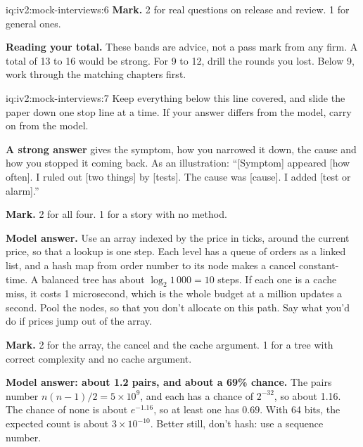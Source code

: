 \begin{solution}{iq:iv2:mock-interviews:6}
\textbf{Mark.} 2 for real questions on release and review. 1 for general ones.

\medskip
\textbf{Reading your total.} These bands are advice, not a pass mark from any firm. A total of 13 to 16 would be strong. For 9 to 12, drill the rounds you lost. Below 9, work through the matching chapters first.

\end{solution}

\begin{solution}{iq:iv2:mock-interviews:7}
Keep everything below this line covered, and slide the paper down one stop line at a time. If your answer differs from the model, carry on from the model.

\ivstop
\textbf{A strong answer} gives the symptom, how you narrowed it down, the cause and how you stopped it coming back. As an illustration: ``[Symptom] appeared [how often]. I ruled out [two things] by [tests]. The cause was [cause]. I added [test or alarm].''

\textbf{Mark.} 2 for all four. 1 for a story with no method.

\ivstop
\textbf{Model answer.} Use an array indexed by the price in ticks, around the current price, so that a lookup is one step. Each level has a queue of orders as a linked list, and a hash map from order number to its node makes a cancel constant-time. A balanced tree has about $\log_2 1\,000 = 10$ steps. If each one is a cache miss, it costs 1 microsecond, which is the whole budget at a million updates a second. Pool the nodes, so that you don't allocate on this path. Say what you'd do if prices jump out of the array.

\textbf{Mark.} 2 for the array, the cancel and the cache argument. 1 for a tree with correct complexity and no cache argument.

\ivstop
\textbf{Model answer: about 1.2 pairs, and about a 69\% chance.} The pairs number $n(n - 1)/2 = 5 \times 10^9$, and each has a chance of $2^{-32}$, so about 1.16. The chance of none is about $e^{-1.16}$, so at least one has $0.69$. With 64 bits, the expected count is about $3 \times 10^{-10}$. Better still, don't hash: use a sequence number.


\end{solution}
